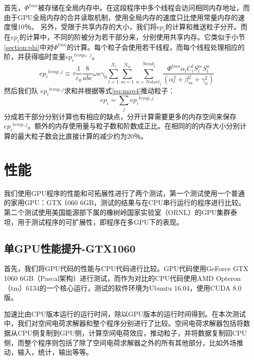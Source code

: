首先，$\Phi^{lmn}$被存储在全局内存中。在这段程序中多个线程会访问相同内存地址，而由于GPU全局内存的合并读取机制，使用全局内存的速度只比使用常量内存的速度慢10％。
另外，受限于共享内存的大小，我们将$ ep_{i} $的计算和推送粒子分开。而在$ ep_{i} $的计算中，不同的阶被分为若干部分来，分别使用共享内存。它类似于小节 \ref{section:phi}中对$\Phi^{lmn}$的计算。每个粒子会使用若干线程，而每个线程处理相应的阶，并获得临时变量${e{{p}_{i}}^{temp，j}}$。
\begin{equation}
{e{{p}_{i}}^{temp,j}}\equiv \tau \frac{1}{{{\varepsilon }_{0}}}\frac{8}{abc}\omega \kappa {{\gamma }_{0}}\sum\limits_{l=1}^{{{N}_{l}}}{\sum\limits_{m=1}^{{{N}_{m}}}{\sum\limits_{n=Nstar{{t}_{j}}}^{Nen{{d}_{j}}}{\frac{\Phi^{lmn}{{\alpha }_{l}}C_{i}^{l}S_{i}^{m}S_{i}^{n}}{(\alpha _{l}^{2}+\beta _{m}^{2}+\gamma _{n}^{2})}}}}
\end{equation}
然后我们队 ${e{{p}_{i}}^{temp,j}}$求和并根据等式\ref{eq:map4}推动粒子：
\begin{equation}
e{{p}_{i}}=\sum\limits_{j}{e{{p}_{i}}^{temp,j}}
\end{equation}
分成若干部分分别计算也有相应的缺点，分开计算需要更多的内存空间来保存${e{{p}_{i}}^{temp,j}}$。额外的内存使用量与粒子数和阶数成正比。在相同的的内存大小分别计算的最大粒子数会比直接计算的减少约为20％。

\section{性能}               \label{section:performance}
我们使用GPU程序的性能和可拓展性进行了两个测试，第一个测试使用一个普通的家用GPU：GTX 1060 6GB，测试的结果与在CPU串行运行的程序进行比较。第二个测试使用美国能源部下属的橡树岭国家实验室（ORNL）的GPU集群泰坦，用于测试程序的可扩展性，即程序在多GPU下的表现。

\subsection{单GPU性能提升-GTX1060}
首先，我们将GPU代码的性能与CPU代码进行比较。GPU代码使用GeForce GTX 1060 6GB（Pascal架构）进行测试，而作为对比的CPU代码使用AMD Opteron（tm）6134的一个核心运行，测试的软件环境为Ubuntu 16.04，使用CUDA 8.0版。

加速比由CPU版本运行的运行时间，除以GPU版本的运行时间得到。在本次测试中，我们对空间电荷求解器和整个程序分别进行了比较。空间电荷求解器包括将数据从CPU侧复制到GPU侧，计算空间电荷效应，推动粒子，并将数据复制回CPU侧，而整个程序则包括了除了空间电荷求解器之外的所有其他部分，比如外场推动，输入，统计，输出等等。

